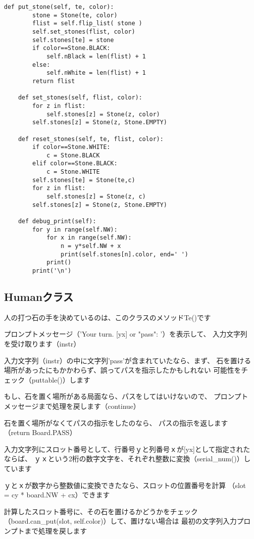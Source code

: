 \documentclass[uplatex,a4paper,11pt,oneside,openany]{jsbook}
\begin{document}
\begin{lstlisting}[caption=Board class,label=othello05]
    def put_stone(self, te, color):
        stone = Stone(te, color)
        flist = self.flip_list( stone )
        self.set_stones(flist, color)
        self.stones[te] = stone
        if color==Stone.BLACK:
            self.nBlack = len(flist) + 1
        else:
            self.nWhite = len(flist) + 1
        return flist

    def set_stones(self, flist, color):
        for z in flist:
            self.stones[z] = Stone(z, color)
        self.stones[z] = Stone(z, Stone.EMPTY)

    def reset_stones(self, te, flist, color):
        if color==Stone.WHITE:
            c = Stone.BLACK
        elif color==Stone.BLACK:
            c = Stone.WHITE
        self.stones[te] = Stone(te,c)
        for z in flist:
            self.stones[z] = Stone(z, c)
        self.stones[z] = Stone(z, Stone.EMPTY)

    def debug_print(self):
        for y in range(self.NW):
            for x in range(self.NW):
                n = y*self.NW + x
                print(self.stones[n].color, end=' ')
            print()
        print('\n')
\end{lstlisting}

\subsection{Humanクラス}

人の打つ石の手を決めているのは、このクラスのメソッドTe()です

プロンプトメッセージ（'Your turn. [yx] or "pass": '）を表示して、
入力文字列を受け取ります（instr）

入力文字列（instr）の中に文字列'pass'が含まれていたなら、まず、
石を置ける場所があったにもかかわらず、誤ってパスを指示したかもしれない
可能性をチェック（puttable()）します

もし、石を置く場所がある局面なら、パスをしてはいけないので、
プロンプトメッセージまで処理を戻します（continue）

石を置く場所がなくてパスの指示をしたのなら、
パスの指示を返します（return Board.PASS）

入力文字列にスロット番号として、行番号ｙと列番号ｘが[yx]として指定されたならば、
ｙｘという2桁の数字文字を、それぞれ整数に変換（serial\_num()）しています

ｙとｘが数字から整数値に変換できたなら、スロットの位置番号を計算
（slot = cy * board.NW + cx）できます

計算したスロット番号に、その石を置けるかどうかをチェック
（board.can\_put(slot, self.color)）して、置けない場合は
最初の文字列入力プロンプトまで処理を戻します
\end{document}
